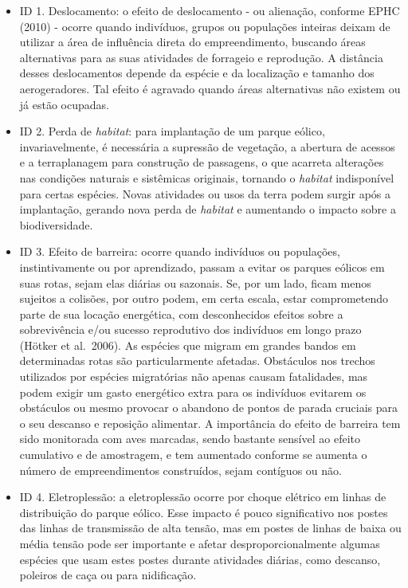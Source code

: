 \documentclass[
  oneside]{scrbook}
\providecommand{\tightlist}{%
  \setlength{\itemsep}{0pt}\setlength{\parskip}{0pt}}
\begin{document}
\begin{itemize}
\tightlist
\item
  ID 1. Deslocamento: o efeito de deslocamento - ou alienação, conforme EPHC (2010) - ocorre quando indivíduos, grupos ou populações inteiras deixam de utilizar a área de influência direta do empreendimento, buscando áreas alternativas para as suas atividades de forrageio e reprodução. A distância desses deslocamentos depende da espécie e da localização e tamanho dos aerogeradores. Tal efeito é agravado quando áreas alternativas não existem ou já estão ocupadas.
\item
  ID 2. Perda de \emph{habitat}: para implantação de um parque eólico, invariavelmente, é necessária a supressão de vegetação, a abertura de acessos e a terraplanagem para construção de passagens, o que acarreta alterações nas condições naturais e sistêmicas originais, tornando o \emph{habitat} indisponível para certas espécies. Novas atividades ou usos da terra podem surgir após a implantação, gerando nova perda de \emph{habitat} e aumentando o impacto sobre a biodiversidade.
\item
  ID 3. Efeito de barreira: ocorre quando indivíduos ou populações, instintivamente ou por aprendizado, passam a evitar os parques eólicos em suas rotas, sejam elas diárias ou sazonais. Se, por um lado, ficam menos sujeitos a colisões, por outro podem, em certa escala, estar comprometendo parte de sua locação energética, com desconhecidos efeitos sobre a sobrevivência e/ou sucesso reprodutivo dos indivíduos em longo prazo (Hötker et al.~2006). As espécies que migram em grandes bandos em determinadas rotas são particularmente afetadas. Obstáculos nos trechos utilizados por espécies migratórias não apenas causam fatalidades, mas podem exigir um gasto energético extra para os indivíduos evitarem os obstáculos ou mesmo provocar o abandono de pontos de parada cruciais para o seu descanso e reposição alimentar. A importância do efeito de barreira tem sido monitorada com aves marcadas, sendo bastante sensível ao efeito cumulativo e de amostragem, e tem aumentado conforme se aumenta o número de empreendimentos construídos, sejam contíguos ou não.
\item
  ID 4. Eletroplessão: a eletroplessão ocorre por choque elétrico em linhas de distribuição do parque eólico. Esse impacto é pouco significativo nos postes das linhas de transmissão de alta tensão, mas em postes de linhas de baixa ou média tensão pode ser importante e afetar desproporcionalmente algumas espécies que usam estes postes durante atividades diárias, como descanso, poleiros de caça ou para nidificação.

\end{itemize}
\end{document}
